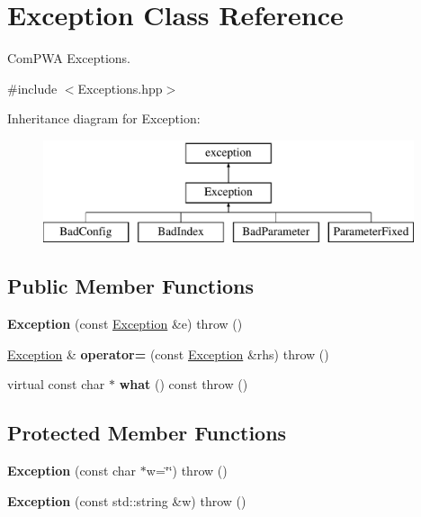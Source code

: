 \hypertarget{class_exception}{\section{Exception Class Reference}
\label{class_exception}
}


Com\-P\-W\-A Exceptions.  




{\ttfamily \#include $<$Exceptions.\-hpp$>$}

Inheritance diagram for Exception\-:\begin{figure}[H]
\begin{center}
\leavevmode
\includegraphics[height=3.000000cm]{class_exception}
\end{center}
\end{figure}
\subsection*{Public Member Functions}
\begin{DoxyCompactItemize}
\item 
\hypertarget{class_exception_adebf1b05f78135d58d634c7dc15590fc}{{\bfseries Exception} (const \hyperlink{class_exception}{Exception} \&e)  throw ()}\label{class_exception_adebf1b05f78135d58d634c7dc15590fc}

\item 
\hypertarget{class_exception_ad900a393018463dabfa6fcfb5c4d22ed}{\hyperlink{class_exception}{Exception} \& {\bfseries operator=} (const \hyperlink{class_exception}{Exception} \&rhs)  throw ()}\label{class_exception_ad900a393018463dabfa6fcfb5c4d22ed}

\item 
\hypertarget{class_exception_a78154a31544a609cbd226d32574f52cd}{virtual const char $\ast$ {\bfseries what} () const   throw ()}\label{class_exception_a78154a31544a609cbd226d32574f52cd}

\end{DoxyCompactItemize}
\subsection*{Protected Member Functions}
\begin{DoxyCompactItemize}
\item 
\hypertarget{class_exception_a158de64eeddf8fe336eeeb61f7cb8ef7}{{\bfseries Exception} (const char $\ast$w=\char`\"{}\char`\"{})  throw ()}\label{class_exception_a158de64eeddf8fe336eeeb61f7cb8ef7}

\item 
\hypertarget{class_exception_ae39c469513bf7efcede819d0086aa739}{{\bfseries Exception} (const std\-::string \&w)  throw ()}\label{class_exception_ae39c469513bf7efcede819d0086aa739}

\end{DoxyCompactItemize}

